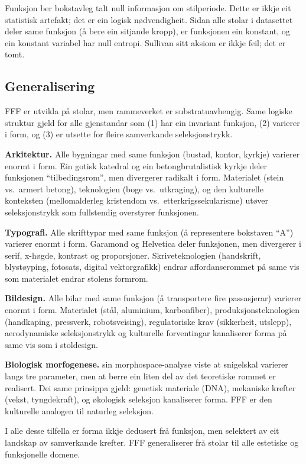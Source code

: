 \documentclass[12pt, a4paper]{article}
\begin{document}
Funksjon ber bokstavleg talt null informasjon om stilperiode. Dette er ikkje eit statistisk artefakt; det er ein logisk nødvendigheit. Sidan alle stolar i datasettet deler same funksjon (å bere ein sitjande kropp), er funksjonen ein konstant, og ein konstant variabel har null entropi. Sullivan sitt aksiom er ikkje feil; det er tomt.

\subsection{Generalisering}

FFF er utvikla på stolar, men rammeverket er substratuavhengig. Same logiske struktur gjeld for alle gjenstandar som (1) har ein invariant funksjon, (2) varierer i form, og (3) er utsette for fleire samverkande seleksjonstrykk.

\textbf{Arkitektur.} Alle bygningar med same funksjon (bustad, kontor, kyrkje) varierer enormt i form. Ein gotisk katedral og ein betongbrutalistisk kyrkje deler funksjonen ``tilbedingsrom'', men divergerer radikalt i form. Materialet (stein vs.\ armert betong), teknologien (boge vs.\ utkraging), og den kulturelle konteksten (mellomalderleg kristendom vs.\ etterkrigssekularisme) utøver seleksjonstrykk som fullstendig overstyrer funksjonen.

\textbf{Typografi.} Alle skrifttypar med same funksjon (å representere bokstaven ``A'') varierer enormt i form. Garamond og Helvetica deler funksjonen, men divergerer i serif, x-høgde, kontrast og proporsjoner. Skriveteknologien (handskrift, blystøyping, fotosats, digital vektorgrafikk) endrar affordanserommet på same vis som materialet endrar stolens formrom.

\textbf{Bildesign.} Alle bilar med same funksjon (å transportere fire passasjerar) varierer enormt i form. Materialet (stål, aluminium, karbonfiber), produksjonsteknologien (handkaping, pressverk, robotsveising), regulatoriske krav (sikkerheit, utslepp), aerodynamiske seleksjonstrykk og kulturelle forventingar kanaliserer forma på same vis som i stoldesign.

\textbf{Biologisk morfogenese.} \citet{raup1966} sin morphospace-analyse viste at snigelskal varierer langs tre parameter, men at berre ein liten del av det teoretiske rommet er realisert. Dei same prinsippa gjeld: genetisk materiale (DNA), mekaniske krefter (vekst, tyngdekraft), og økologisk seleksjon kanaliserer forma. FFF er den kulturelle analogen til naturleg seleksjon.

I alle desse tilfella er forma ikkje dedusert frå funksjon, men selektert av eit landskap av samverkande krefter. FFF generaliserer frå stolar til alle estetiske og funksjonelle domene.
\end{document}
